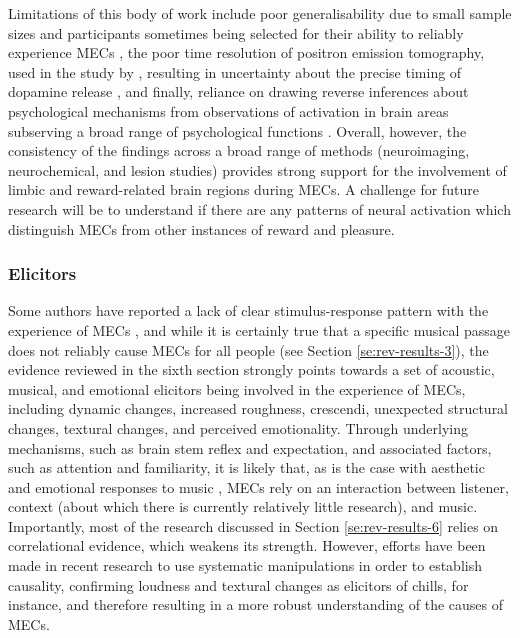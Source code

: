 Limitations of this body of work include poor generalisability due to small sample sizes and participants sometimes being selected for their ability to reliably experience MECs \parencite[e.g.,][]{blood2001, salimpoor2011}, the poor time resolution of positron emission tomography, used in the study by \textcite{salimpoor2011}, resulting in uncertainty about the precise timing of dopamine release \parencite{habibi2014, vuust2010}, and finally, reliance on drawing reverse inferences about psychological mechanisms from observations of activation in brain areas subserving a broad range of psychological functions \parencite{konecni2005, logothetis2008, poldrack2011}. Overall, however, the consistency of the findings across a broad range of methods (neuroimaging, neurochemical, and lesion studies) provides strong support for the involvement of limbic and reward-related brain regions during MECs. A challenge for future research will be to understand if there are any patterns of neural activation which distinguish MECs from other instances of reward and pleasure.

\subsubsection{Elicitors}

Some authors have reported a lack of clear stimulus-response pattern with the experience of MECs \parencite{bannister2020a, grewe2007, nagel2008}, and while it is certainly true that a specific musical passage does not reliably cause MECs for all people (see Section \ref{se:rev-results-3}), the evidence reviewed in the sixth section strongly points towards a set of acoustic, musical, and emotional elicitors being involved in the experience of MECs, including dynamic changes, increased roughness, crescendi, unexpected structural changes, textural changes, and perceived emotionality. Through underlying mechanisms, such as brain stem reflex and expectation, and associated factors, such as attention and familiarity, it is likely that, as is the case with aesthetic and emotional responses to music \parencite{gabrielsson2011, hargreaves2012, juslin2008, juslin2013, scherer2001}, MECs rely on an interaction between listener, context (about which there is currently relatively little research), and music. Importantly, most of the research discussed in Section \ref{se:rev-results-6} relies on correlational evidence, which weakens its strength. However, efforts have been made in recent research to use systematic manipulations in order to establish causality, confirming loudness and textural changes as elicitors of chills, for instance, and therefore resulting in a more robust understanding of the causes of MECs.

